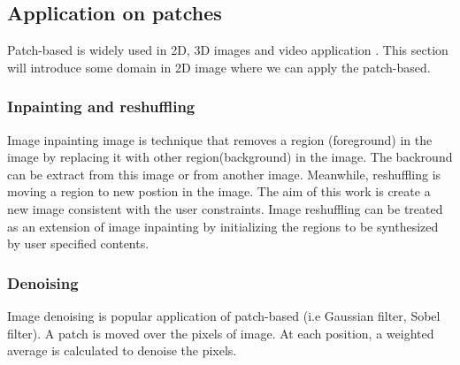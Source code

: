 \subsection{Application on patches}
Patch-based is widely used in 2D, 3D images and video application \cite{barnessurvey}. This section will introduce some domain in 2D image where we can apply the patch-based.
\subsubsection{Inpainting and reshuffling}
Image inpainting \cite{guillemot2014image} image is technique that removes a region (foreground) in the image by replacing it with other region(background) in the image. The backround can be extract from this image or from another image. Meanwhile, reshuffling \cite{cho2008patch} is moving a region to new postion in the image. The aim of this work is create a new image consistent with the user constraints. Image reshuffling can be treated as an extension of image inpainting by initializing the regions to be synthesized by user specified contents.
\subsubsection{Denoising}
Image denoising\cite{barnes2010generalized} is popular application of patch-based (i.e Gaussian filter, Sobel filter). A patch is moved over the pixels of image. At each position, a weighted average is calculated to denoise the pixels.
